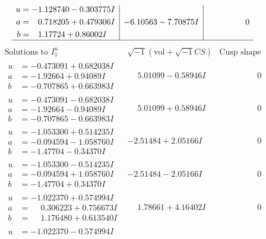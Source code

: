 \documentclass[1p]{elsarticle_modified}
\theoremstyle{definition}
\newcommand{\I}{\sqrt{-1}}
\begin{document}
$$\begin{array}{c|c|c}
\begin{aligned}
u &= -1.128740 - 0.303775 I \\
a &= \phantom{-}0.718205 + 0.479306 I \\
b &= \phantom{-}1.17724 + 0.86002 I\end{aligned}
 & -6.10563 - 7.70875 I & \phantom{-0.000000 } 0\\
 \hline 
 \end{array}$$\newpage$$\begin{array}{c|c|c}  
\text{Solutions to }I^u_{1}& \I (\text{vol} + \sqrt{-1}CS) & \text{Cusp shape}\\
 \hline 
\begin{aligned}
u &= -0.473091 + 0.682038 I \\
a &= -1.92664 + 0.94089 I \\
b &= -0.707865 + 0.663983 I\end{aligned}
 & \phantom{-}5.01099 - 0.58946 I & \phantom{-0.000000 } 0 \\ \hline\begin{aligned}
u &= -0.473091 - 0.682038 I \\
a &= -1.92664 - 0.94089 I \\
b &= -0.707865 - 0.663983 I\end{aligned}
 & \phantom{-}5.01099 + 0.58946 I & \phantom{-0.000000 } 0 \\ \hline\begin{aligned}
u &= -1.053300 + 0.514235 I \\
a &= -0.094594 - 1.058760 I \\
b &= -1.47704 - 0.34370 I\end{aligned}
 & -2.51484 + 2.05166 I & \phantom{-0.000000 } 0 \\ \hline\begin{aligned}
u &= -1.053300 - 0.514235 I \\
a &= -0.094594 + 1.058760 I \\
b &= -1.47704 + 0.34370 I\end{aligned}
 & -2.51484 - 2.05166 I & \phantom{-0.000000 } 0 \\ \hline\begin{aligned}
u &= -1.022370 + 0.574994 I \\
a &= \phantom{-}0.306223 + 0.756673 I \\
b &= \phantom{-}1.176480 + 0.613540 I\end{aligned}
 & \phantom{-}1.78661 + 4.16402 I & \phantom{-0.000000 } 0 \\ \hline\begin{aligned}
u &= -1.022370 - 0.574994 I \\

\end{aligned}
\end{array}$$
\end{document}
